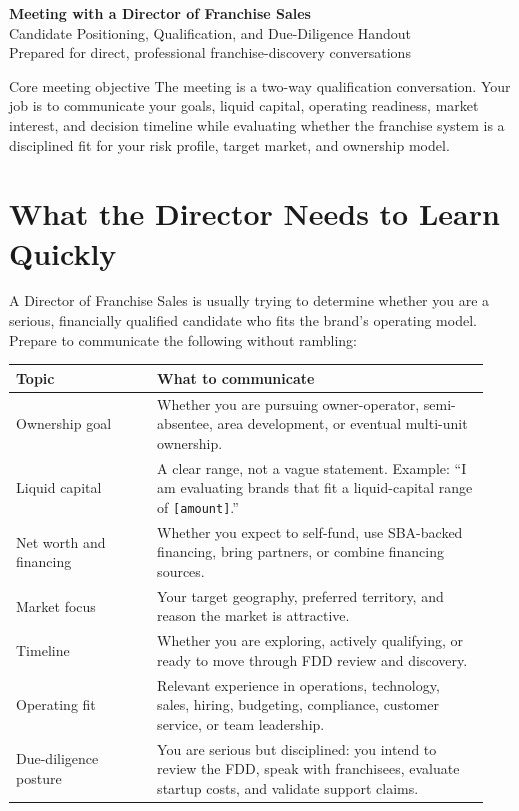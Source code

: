 \documentclass[11pt]{article}
\newcommand{\placeholder}[1]{\textcolor{accent}{\texttt{[#1]}}}
\begin{document}
\begin{center}
  {\LARGE\bfseries Meeting with a Director of Franchise Sales}\\[0.35em]
  {\large Candidate Positioning, Qualification, and Due-Diligence Handout}\\[0.4em]
  {\small Prepared for direct, professional franchise-discovery conversations}
\end{center}

\vspace{0.5em}

\begin{keybox}{Core meeting objective}
The meeting is a two-way qualification conversation. Your job is to communicate your goals, liquid capital, operating readiness, market interest, and decision timeline while evaluating whether the franchise system is a disciplined fit for your risk profile, target market, and ownership model.
\end{keybox}

\section{What the Director Needs to Learn Quickly}

A Director of Franchise Sales is usually trying to determine whether you are a serious, financially qualified candidate who fits the brand's operating model. Prepare to communicate the following without rambling:

\begin{longtable}{>{\raggedright\arraybackslash}p{0.28\linewidth}>{\raggedright\arraybackslash}p{0.66\linewidth}}
\toprule
\textbf{Topic} & \textbf{What to communicate} \\
\midrule
Ownership goal & Whether you are pursuing owner-operator, semi-absentee, area development, or eventual multi-unit ownership. \\
Liquid capital & A clear range, not a vague statement. Example: ``I am evaluating brands that fit a liquid-capital range of \placeholder{amount}.'' \\
Net worth and financing & Whether you expect to self-fund, use SBA-backed financing, bring partners, or combine financing sources. \\
Market focus & Your target geography, preferred territory, and reason the market is attractive. \\
Timeline & Whether you are exploring, actively qualifying, or ready to move through FDD review and discovery. \\
Operating fit & Relevant experience in operations, technology, sales, hiring, budgeting, compliance, customer service, or team leadership. \\
Due-diligence posture & You are serious but disciplined: you intend to review the FDD, speak with franchisees, evaluate startup costs, and validate support claims. \\
\bottomrule
\end{longtable}
\end{document}
